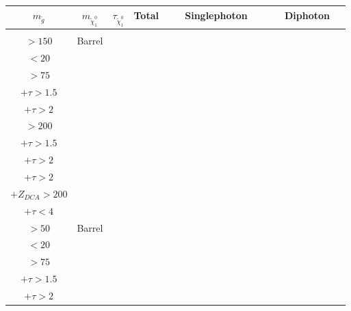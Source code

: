 \documentclass[8pt]{extarticle}
\begin{document}
\begin{longtable}{|c|c|c|c|c|c|c|c|c|c|c|c|c|c|c|c|c|c|c|c|c|c|c|}
\hline 
$m_{\tilde{g}}$ & $m_{\tilde{\chi}_1^0}$ & $\tau_{\tilde{\chi}_1^0}$ & Total & \multicolumn{11}{|c|}{Singlephoton} & \multicolumn{8}{|c|}{Diphoton} \\ 
\hline 
 & & & & \begin{tabular}{@{}c@{}} $p_T$ \\ $> 150$\end{tabular} & Barrel & \begin{tabular}{@{}c@{}} $E_T^{miss}$ \\ $< 20$\end{tabular} & \begin{tabular}{@{}c@{}} $E_T^{miss}$ \\ $> 75$\end{tabular} & \begin{tabular}{@{}c@{}} $E_T^{miss} > 75$ \\ $+ \tau > 1.5$ \end{tabular} & \begin{tabular}{@{}c@{}} $E_T^{miss} > 75$ \\ $+ \tau > 2$ \end{tabular} & \begin{tabular}{@{}c@{}} $E_T^{miss}$ \\ $> 200$\end{tabular} & \begin{tabular}{@{}c@{}} $E_T^{miss} > 200$ \\ $+ \tau > 1.5$ \end{tabular} & \begin{tabular}{@{}c@{}} $E_T^{miss} > 200$ \\ $+ \tau > 2$ \end{tabular} & \begin{tabular}{@{}c@{}} $E_T^{miss} > 200$ \\ $+ \tau > 2$ \\ $+Z_{DCA} > 200$\end{tabular} & \begin{tabular}{@{}c@{}} $E_{T}^{miss} > 200$ \\ $+ \tau < 4$ \end{tabular} & \begin{tabular}{@{}c@{}} $p_T$ \\ $> 50$\end{tabular} & Barrel & \begin{tabular}{@{}c@{}} $E_T^{miss}$ \\ $< 20$\end{tabular} & \begin{tabular}{@{}c@{}} $E_T^{miss}$ \\ $> 75$\end{tabular} & \begin{tabular}{@{}c@{}} $E_T^{miss} > 75$ \\ $+ \tau > 1.5$\end{tabular} & \begin{tabular}{@{}c@{}} $E_T^{miss} > 75$ \\ $+ \tau > 2$ 
\end{longtable}
\end{document}
